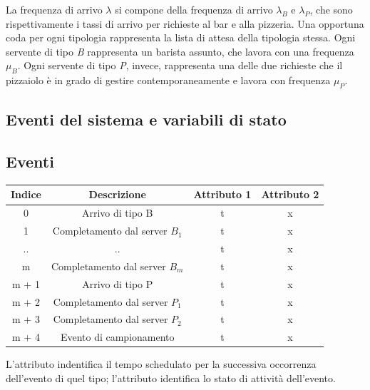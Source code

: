 \documentclass[a4paper, 12pt]{article}
\newcommand{\key}[1]{\texttt{\StrSubstitute{#1}{_}{\_}}}
\begin{document}
La frequenza di arrivo $\lambda$ si compone della frequenza di arrivo $\lambda_B$ e $\lambda_P$, che sono rispettivamente i tassi di arrivo per richieste al bar e alla pizzeria. Una opportuna coda per ogni tipologia rappresenta la lista di attesa della tipologia stessa. Ogni servente di tipo \textit{B} rappresenta un barista assunto, che lavora con una frequenza $\mu_B$. Ogni servente di tipo \textit{P}, invece, rappresenta una delle due richieste che il pizzaiolo è in grado di gestire contemporaneamente e lavora con frequenza $\mu_P$.


\subsection{Eventi del sistema e variabili di stato}
\subsection{Eventi}
\begin{center}

\begin{tabular}{ |c|c|c|c| }
	\hline
    \cellcolor{cellcolor}Indice & \cellcolor{cellcolor}Descrizione & \cellcolor{cellcolor}Attributo 1 & \cellcolor{cellcolor}Attributo 2 \\
    \hline
    \hline
    0 & Arrivo di tipo B & t & x \\
    \hline
    1 & Completamento dal server $B_1$ & t & x \\
    \hline
    .. & .. & t & x \\
    \hline
    m & Completamento dal server $B_m$ & t & x \\
    \hline
    m + 1 & Arrivo di tipo P & t & x \\
    \hline
    m + 2 & Completamento dal server $P_1$ & t & x \\
    \hline
    m + 3 & Completamento dal server $P_2$ & t & x \\
    \hline
    m + 4 & Evento di campionamento & t & x \\
    \hline
\end{tabular}
\end{center}
L'attributo \key{t} indentifica il tempo schedulato per la successiva occorrenza dell'evento di quel tipo; l'attributo \key{x} identifica lo stato di attività
dell'evento.
\end{document}
